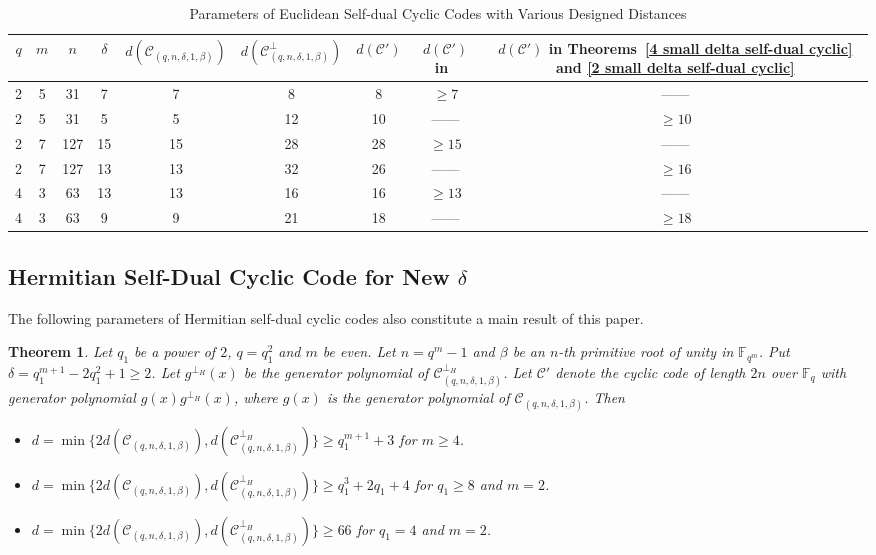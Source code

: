 \documentclass[10pt,a4paper]{amsart}
\newtheorem{theorem}{Theorem}
\begin{document}
\begin{table}[H]
  \centering
  \small
  \caption{Parameters of Euclidean Self-dual Cyclic Codes with Various Designed Distances}
  \label{design distance}
  \begin{tabular}{|c|c|c|c|c|c|c|c|c|}
    \hline
    $q$ & $m$ & $n$ & $\delta$ & $d(\mathcal{C}_{(q,n,\delta,1,\beta)})$ & $d(\mathcal{C}_{(q,n,\delta,1,\beta)}^\perp)$ & $d(\mathcal{C}')$ & $d(\mathcal{C}')$ in~\cite{10856234} & $d(\mathcal{C}')$ in Theorems~\ref{4 small delta self-dual cyclic} and \ref{2 small delta self-dual cyclic} \\
    \hline
    2 & 5 & 31 & 7 & 7 & 8 & 8 & $\ge 7$ & —— \\
    \hline
    2 & 5 & 31 & 5 & 5 & 12 & 10 & —— & $\ge 10$ \\
    \hline
    2 & 7 & 127 & 15 & 15 & 28 & 28 & $\ge 15$ & —— \\
    \hline
    2 & 7 & 127 & 13 & 13 & 32 & 26 & —— & $\ge 16$ \\
    \hline
    4 & 3 & 63 & 13 & 13 & 16 & 16 & $\ge 13$ & —— \\
    \hline
    4 & 3 & 63 & 9 & 9 & 21 & 18 & —— & $\ge 18$ \\
    \hline
  \end{tabular}
\end{table}

\subsection{Hermitian Self-Dual Cyclic Code for New $\delta$}

The following parameters of Hermitian self-dual cyclic codes also constitute a main result of this paper.


\begin{theorem}
	\label{even Hermitian low delta}
	Let $q_1$ be a power of $2$, $q=q_1^2$ and $m$ be even. Let $n=q^m-1$ and $\beta$ be an $n$-th primitive root of unity in $\mathbb{F}_{q^m}$. Put $\delta=q_1^{m+1}-2q_1^2+1\ge 2$. Let $g^{\perp_H}(x)$ be the generator polynomial of $\mathcal{C}_{(q,n,\delta,1,\beta)}^{\perp_H}$. Let $\mathcal{C}'$ denote the cyclic code of length $2n$ over $\mathbb{F}_q$ with generator polynomial $g(x)g^{\perp_H}(x)$, where $g(x)$ is the generator polynomial of $\mathcal{C}_{(q,n,\delta,1,\beta)}$. Then
	\begin{itemize}
		\item $d=\min\{2d(\mathcal{C}_{(q,n,\delta,1,\beta)}),d(\mathcal{C}_{(q,n,\delta,1,\beta)}^{\perp_H})\}\ge q_1^{m+1}+3$ for $m\ge4$.
		\item $d=\min\{2d(\mathcal{C}_{(q,n,\delta,1,\beta)}),d(\mathcal{C}_{(q,n,\delta,1,\beta)}^{\perp_H})\}\ge q_1^3+2q_1+4$ for $q_1\ge8$ and $m=2$.
		\item $d=\min\{2d(\mathcal{C}_{(q,n,\delta,1,\beta)}),d(\mathcal{C}_{(q,n,\delta,1,\beta)}^{\perp_H})\}\ge66$ for $q_1=4$ and $m=2$.
	\end{itemize}
\end{theorem}
\end{document}
